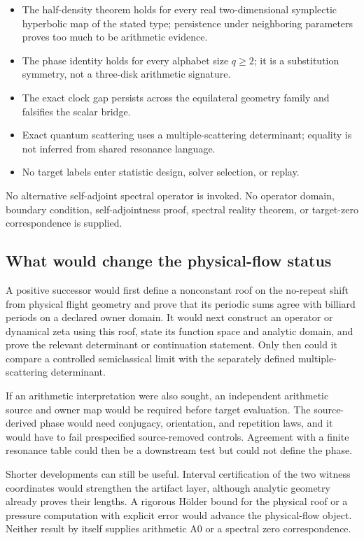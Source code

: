 \documentclass[11pt,a4paper]{article}
\theoremstyle{definition}
\theoremstyle{remark}
\begin{document}
\begin{itemize}
 \item The half-density theorem holds for every real two-dimensional symplectic hyperbolic map of the stated type; persistence under neighboring parameters proves too much to be arithmetic evidence.
 \item The phase identity holds for every alphabet size \(q\ge2\); it is a substitution symmetry, not a three-disk arithmetic signature.
 \item The exact clock gap persists across the equilateral geometry family and falsifies the scalar bridge.
 \item Exact quantum scattering uses a multiple-scattering determinant; equality is not inferred from shared resonance language.
 \item No target labels enter statistic design, solver selection, or replay.
\end{itemize}

No alternative self-adjoint spectral operator is invoked. No operator domain, boundary condition, self-adjointness proof, spectral reality theorem, or target-zero correspondence is supplied.

\subsection{What would change the physical-flow status}

A positive successor would first define a nonconstant roof on the no-repeat shift from physical flight geometry and prove that its periodic sums agree with billiard periods on a declared owner domain. It would next construct an operator or dynamical zeta using this roof, state its function space and analytic domain, and prove the relevant determinant or continuation statement. Only then could it compare a controlled semiclassical limit with the separately defined multiple-scattering determinant.

If an arithmetic interpretation were also sought, an independent arithmetic source and owner map would be required before target evaluation. The source-derived phase would need conjugacy, orientation, and repetition laws, and it would have to fail prespecified source-removed controls. Agreement with a finite resonance table could then be a downstream test but could not define the phase.

Shorter developments can still be useful. Interval certification of the two witness coordinates would strengthen the artifact layer, although analytic geometry already proves their lengths. A rigorous Hölder bound for the physical roof or a pressure computation with explicit error would advance the physical-flow object. Neither result by itself supplies arithmetic A0 or a spectral zero correspondence.
\end{document}
